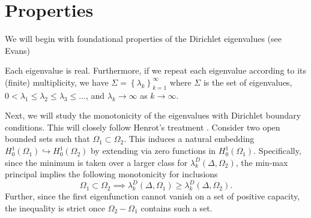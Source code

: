 \section{Properties}
We will begin with foundational properties of the Dirichlet eigenvalues (see Evans\cite{evans})
\begin{theorem}
  Each eigenvalue is real.
  Furthermore, if we repeat each eigenvalue according to its (finite) multiplicity, we have
    $\Sigma = \left\{ \lambda_{k} \right\}_{k=1}^\infty$ 
    where $\Sigma$ is the set of eigenvalues, 
    $0 < \lambda_1 \leq \lambda_2 \leq \lambda_3 \leq \ldots$,
    and $\lambda_{k} \to \infty$ as $k \to \infty$.
\end{theorem}
Next, we will study the monotonicity of the eigenvalues with Dirichlet boundary conditions.
This will closely follow Henrot's treatment \cite{henrot}.
Consider two open bounded sets such that $\Omega_{1} \subset \Omega_{2}$.
This induces a natural embedding $H_{0}^{1}(\Omega_{1}) \hookrightarrow H_{0}^{1}(\Omega_{2})$ by extending via zero functions in $H_{0}^{1}(\Omega_{1})$.
Specifically, since the minimum is taken over a larger class for $\lambda_{k}^{D}(\Delta,\Omega_{2})$, the min-max principal implies the following monotonicity for inclusions
\[
\Omega_{1} \subset \Omega_{2} \implies \lambda_{k}^{D} (\Delta,\Omega_{1}) \geq \lambda_{k}^{D}(\Delta,\Omega_{2})
.\] 
Further, since the first eigenfunction cannot vanish on a set of positive capacity, the inequality is strict once $\Omega_{2} - \Omega_{1}$ contains such a set.

